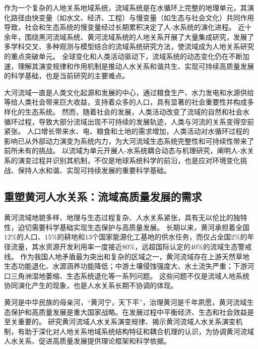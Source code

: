 作为一个复杂的人地关系地域系统，流域系统是在水循环上完整的地理单元，其演化路径由快变量（如水文、经济、工程）与慢变量（如生态与社会文化）共同作用导致，社会和生态系统的慢变量经过长期累积决定了人-水系统的演化进程\cite{falkenmark2021}。
近十余年，围绕黑河流域系统、黄河流域系统的人地关系开展了大量集成研究，发展了多学科交叉、多种观测与模型结合的流域系统研究方法，使流域成为人地关系研究的重点突破单元\cite{cheng2014, fu2021a}。
全球变化和人类活动驱动下，流域系统的动态变化仍在不断加速，理解其演变规律和作用机制是推动人水关系和谐共生、实现可持续高质量发展的科学基础，也是当前研究的主要难点\cite{reyers2018}。

大河流域一直是人类文化起源和发展的中心，通过粮食生产、水力发电和水源供给等给人类社会带来巨大收益，支持着众多的人口，具有显著的社会重要性并构成多样化的生态系统\cite{best2019}。
然而，随着社会的发展，人类活动改变了流域的自然和社会水循环过程，导致大部分流域出现不可持续的发展轨迹，人类与河流的关系变得空前紧张\cite{best2019, best2020}。
人口增长带来水、电、粮食和土地的需求增加，人类活动对水循环过程的影响已从外部动力演变为系统内力，为大河流域生态系统完整性和可持续性带来了前所未有的挑战\cite{crutzen2006, dibaldassarre2019}。
以流域为单元开展人-水系统耦合动态与机理研究，阐明人-水关系的演变过程并识别其机制，不仅是地球系统科学的前沿，也是应对环境变化挑战、保持人水和谐、实现可持续发展的重要科学基础。

\subsection{重塑黄河人水关系：流域高质量发展的需求}

黄河流域地貌多样、地理与生态过程复杂、人水关系紧张，具有无以伦比的独特性，迫切需要科学基础实现生态保护与高质量发展。
长期以来，黄河承担着全国$12\%$的人口、$15\%$的耕地和$13$个国家能源化工基地的供水任务，而仅占全国$2\%$的年径流量，其水资源开发利用率一度接近$80\%$，远超国际认定的$40\%$的流域生态警戒线\cite{fu2021a}。
作为我国人地矛盾最为突出和复杂的区域之一，黄河流域存在上游天然草地生态功能退化、水源涵养功能降低；中游土壤侵蚀强度大、水土流失严重；下游河口三角洲湿地萎缩、生态系统退化等一系列问题\cite{mazhuguo2020}。
这些问题不仅是流域人地系统协同演化产生的现象，也是人水关系长期不协调的体现\cite{fu2021a}。

黄河是中华民族的母亲河，“黄河宁，天下平”，治理黄河是千年夙愿，黄河流域生态保护和高质量发展是重大国家战略。在发展过程中平衡经济、生态和社会效益是至关重要的。
研究黄河流域人水关系演变规律、揭示黄河流域人水关系演变机制，有助于深化对人地关系地域系统结构特征和耦合机理的认识，为协调黄河流域人水关系、促进高质量发展提供理论框架和科学依据。
